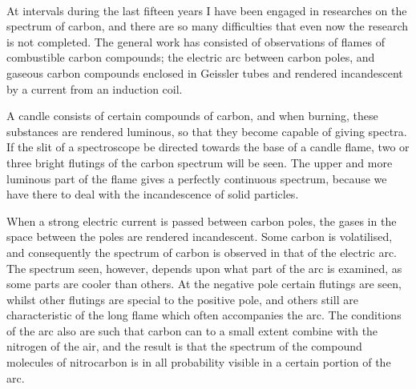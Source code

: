 \documentclass[a4paper, 12pt, oneside, polutonikogreek, english]{article}
\begin{document}
\paragraph{}
At intervals during the last fifteen years I have been engaged in researches on the spectrum of carbon, and there are so many difficulties that even now the research is not completed. The general work has consisted of observations of flames of combustible carbon compounds; the electric arc between carbon poles, and gaseous carbon compounds enclosed in Geissler tubes and rendered incandescent by a current from an induction coil.

A candle consists of certain compounds of carbon, and when burning, these substances are rendered luminous, so that they become capable of giving spectra. If the slit of a spectroscope be directed towards the base of a candle flame, two or three bright flutings of the carbon spectrum will be seen. The upper and more luminous part of the flame gives a perfectly continuous spectrum, because we have there to deal with the incandescence of solid particles.

When a strong electric current is passed between carbon poles, the gases in the space between the poles are rendered incandescent. Some carbon is volatilised, and consequently the spectrum of carbon is observed in that of the electric arc. The spectrum seen, however, depends upon what part of the arc is examined, as some parts are cooler than others. At the negative pole certain flutings are seen, whilst other flutings are special to the positive pole, and others still are characteristic of the long flame which often accompanies the arc. The conditions of the arc also are such that carbon can to a small extent combine with the nitrogen of the air, and the result is that the spectrum of the compound molecules of nitrocarbon is in all probability visible in a certain portion of the arc.
\end{document}
